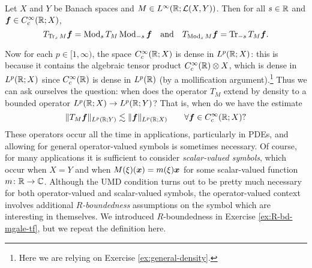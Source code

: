{\begin{prop}
  Let $X$ and $Y$ be Banach spaces and $M \in L^\infty(\mathbb{R};\mathcal{L}(X,Y))$.
  Then for all $s \in \mathbb{R}$ and $\bm{f} \in C^{\infty}_{c}(\mathbb{R};X)$,
  \begin{equation*}
    T_{\operatorname{Tr}_{s} M} \bm{f} = \operatorname{Mod}_{s} T_{M} \operatorname{Mod}_{-s} \bm{f} \quad \text{and} \quad
    T_{\operatorname{Mod}_{s} M} \bm{f} = \operatorname{Tr}_{-s} T_{M} \bm{f}. 
  \end{equation*}
\end{prop}

Now for each $p \in [1,\infty)$, the space $C_{c}^\infty(\mathbb{R};X)$ is dense in $L^p(\mathbb{R};X)$: this is because it contains the algebraic tensor product $C_{c}^\infty(\mathbb{R}) \otimes X$, which is dense in $L^p(\mathbb{R};X)$ since $C_{c}^\infty(\mathbb{R})$ is dense in $L^p(\mathbb{R})$ (by a mollification argument).\footnote{Here we are relying on Exercise \ref{ex:general-density}.}
Thus we can ask ourselves the question: when does the operator $T_{M}$ extend by density to a bounded operator $L^p(\mathbb{R};X) \to L^p(\mathbb{R};Y)$?
That is, when do we have the estimate
\begin{equation*}
  \|T_{M} \bm{f}\|_{L^p(\mathbb{R};Y)} \lesssim \|\bm{f}\|_{L^p(\mathbb{R};X)} \qquad \forall \bm{f} \in C_{c}^\infty(\mathbb{R};X)?
\end{equation*}
These operators occur all the time in applications, particularly in PDEs, and allowing for general operator-valued symbols is sometimes necessary.
Of course, for many applications it is sufficient to consider \emph{scalar-valued symbols}, which occur when $X = Y$ and when $M(\xi)(\bm{x}) = m(\xi)\bm{x}$ for some scalar-valued function $m \colon \mathbb{R} \rightarrow \mathbb{C}$.
Although the UMD condition turns out to be pretty much necessary for both operator-valued and scalar-valued symbols, the operator-valued context involves additional \emph{$R$-boundedness} assumptions on the symbol which are interesting in themselves.
We introduced $R$-boundedness in Exercise \ref{ex:R-bd-mgale-tf}, but we repeat the definition here. 

}
